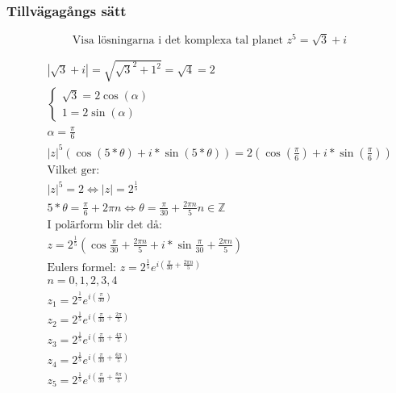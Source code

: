 \subsubsection{Tillvägagångs sätt}
\begin{equation}
  \text{Visa lösningarna i det komplexa tal planet } z^5 = \sqrt{3} + i
\end{equation}

\begin{align*}
  &\quad |\sqrt{3} + i| = \sqrt{\sqrt{3}^2 + 1^2} = \sqrt{4} = 2 \\
  &\quad \left\{ \begin{array} { l } { \sqrt{3} = 2 \cos(\alpha)} \\ { 1 = 2 \sin(\alpha) } \end{array} \right. \\
  &\quad \alpha = \frac{\pi}{6} \\
  &\quad |z|^5(\cos{(5*\theta)} + i * \sin{(5*\theta)}) = 2(\cos{(\frac{\pi}{6})} + i * \sin{(\frac{\pi}{6})}) \\
  &\quad \text{Vilket ger: } \\
  &\quad |z|^5 = 2 \Leftrightarrow |z| = 2^{\frac{1}{5}} \\
  &\quad 5*\theta = \frac{\pi}{6} + 2 \pi n \Leftrightarrow \theta = \frac{\pi}{30} + \frac{2 \pi n}{5} n \in \mathbb{Z} \\
  &\quad \text{I polärform blir det då: } \\
  &\quad z = 2^{\frac{1}{5}} (\cos{\frac{\pi}{30} + \frac{2 \pi n}{5}} + i * \sin{\frac{\pi}{30} + \frac{2 \pi n}{5}}) \\
  &\quad \text{Eulers formel: } z = 2^{\frac{1}{5}} e^{i (\frac{\pi}{30} + \frac{2 \pi n}{5})} \\
  &\quad n = 0,1,2,3,4 \\
  &\quad z_1 = 2^{\frac{1}{5}} e^{i (\frac{\pi}{30})} \\
  &\quad z_2 = 2^{\frac{1}{5}} e^{i (\frac{\pi}{30} + \frac{2 \pi}{5})} \\
  &\quad z_3 = 2^{\frac{1}{5}} e^{i (\frac{\pi}{30} + \frac{4 \pi}{5})} \\
  &\quad z_4 = 2^{\frac{1}{5}} e^{i (\frac{\pi}{30} + \frac{6 \pi}{5})} \\
  &\quad z_5 = 2^{\frac{1}{5}} e^{i (\frac{\pi}{30} + \frac{8 \pi}{5})} \\
\end{align*}

